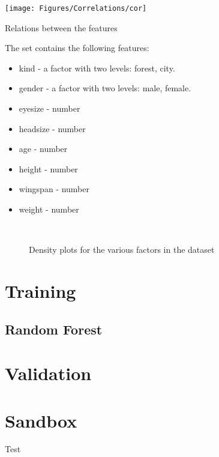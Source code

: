 \documentclass[11pt,a4paper,oldtoc,final]{tufte-book}
\begin{document}
\begin{marginfigure}
    \texttt{[image: Figures/Correlations/cor]}
    \caption{Relations between the features}
\end{marginfigure}

The set contains the following features:
\begin{itemize}
    \item kind     - a factor with two levels: forest, city.
    \item gender   - a factor with two levels: male, female.
    \item eyesize  - number
    \item headsize - number
    \item age      - number
    \item height   - number
    \item wingspan - number
    \item weight   - number
\end{itemize}


\begin{figure*}
     \\
     \caption{Density plots for the various factors in the dataset}
\end{figure*}


\chapter{Training}

\section{Random Forest}

\cite{Breiman2001}

\chapter{Validation}

\chapter{Sandbox}

Test \cite{Tufte2006}



%


%

\backmatter




\printindex
\end{document}
